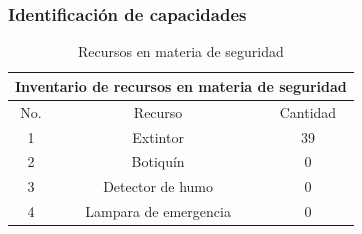 \subsubsection{Identificación de capacidades}

\begin{table}[H]
    \centering
    \caption{Recursos en materia de seguridad}
    \begin{tabular}{c c c}
    \hline
    \multicolumn{3}{c}{Inventario de recursos en materia de seguridad}\\
    \hline
         No.& Recurso & Cantidad  \\
    \hline
         1& Extintor & 39  \\
    \hline
         2& Botiquín & 0  \\
    \hline
         3& Detector de humo & 0 \\
    \hline
         4& Lampara de emergencia & 0 \\
    \hline     
    \end{tabular}
    \label{tab:inventario}
\end{table}
%
%

